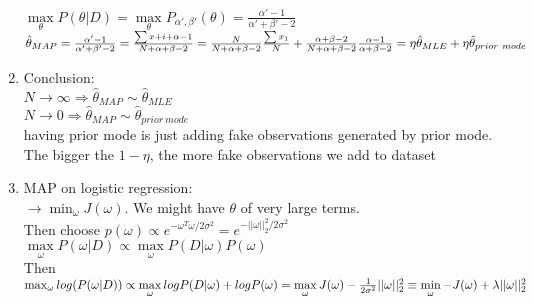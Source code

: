 \documentclass[12pt]{article}
\begin{document}
\begin{enumerate}
                $\max\limits_\theta P(\theta | D) = \max\limits_\theta P_{\alpha', \beta'}(\theta) = \frac{\alpha' - 1}{\alpha' + \beta' -2}$\\
                $\hat{\theta}_{MAP} = \frac{\alpha' - 1}{\alpha' + \beta' -2} = \frac{\sum x+i + \alpha - 1}{N + \alpha + \beta -2}\\
                = \frac{N}{N + \alpha + \beta -2}\frac{\sum x_1}{N} + \frac{\alpha + \beta - 2}{N + \alpha + \beta - 2}\frac{\alpha - 1}{\alpha + \beta - 2}\\
                = \eta\hat{\theta}_{MLE} + \eta\hat{\theta}_{prior \ mode}$
            \item Conclusion:\\
            $N \rightarrow \infty \Rightarrow \hat{\theta}_{MAP} \sim \hat{\theta}_{MLE}$\\
            $N \rightarrow 0 \Rightarrow \hat{\theta}_{MAP} \sim \hat{\theta}_{prior \ mode}$\\
            having prior mode is just adding fake observations generated by prior mode. The bigger the $1 - \eta$, the more fake observations we add to dataset

            \item MAP on logistic regression:\\
            $\rightarrow \min_\omega J(\omega)$. We might have $\theta$ of very large terms. \\
            Then choose $p(\omega) \propto e^{-\omega^T\omega / 2\sigma^2} = e^{-||\omega||^2_2/2\sigma^2}$ \\
            $\max\limits_\omega P(\omega | D) \propto \max\limits_\omega P(D | \omega)P(\omega)$\\
            Then $\max_{\omega} log(P(\omega | D)) \propto \max\limits_{\omega}logP(D | \omega) + log P(\omega) \\
            = \max\limits_{\omega}J(\omega) - \frac{1}{2\sigma^2}||\omega||^2_2\\
            \equiv \min\limits_\omega -J(\omega) + \lambda ||\omega||^2_2$
        \end{enumerate}
        \newpage

    \newpage
    
\end{document}

